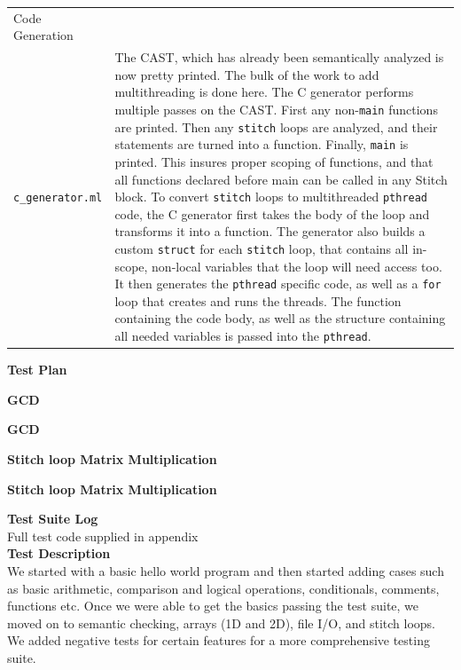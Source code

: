 \documentclass[11pt, oneside]{article}   	%
\begin{document}
\begin{tabular}{ l p{12cm} }
Code Generation\\\verb|c_generator.ml| & The CAST, which has already been semantically analyzed is now pretty printed.  The bulk of the work to add multithreading is done here.  The C generator performs multiple passes on the CAST.  First any non-\verb|main| functions are printed.  Then any \verb|stitch| loops are analyzed, and their statements are turned into a function.  Finally, \verb|main| is printed.  This insures proper scoping of functions, and that all functions declared before main can be called in any Stitch block.  To convert \verb|stitch| loops to multithreaded \verb|pthread| code, the C generator first takes the body of the loop and transforms it into a function.  The generator also builds a custom \verb|struct| for each \verb|stitch| loop, that contains all in-scope, non-local variables that the loop will need access too.  It then generates the \verb|pthread| specific code, as well as a \verb|for| loop that creates and runs the threads.  The function containing the code body, as well as the structure containing all needed variables is passed into the \verb|pthread|.
\end{tabular}
\newpage


\LARGE\textbf{Test Plan}\\[2em]
\normalsize

\Large\textbf{GCD}\\[1em]
\normalsize

\newpage
\Large\textbf{GCD}\\[1em]
\normalsize

\newpage
\Large\textbf{Stitch loop Matrix Multiplication}\\[1em]
\normalsize

\newpage
\Large\textbf{Stitch loop Matrix Multiplication}\\[1em]
\normalsize

\newpage
\Large\textbf{Test Suite Log}\\[1em]
\normalsize
Full test code supplied in appendix\\

\newpage
\Large\textbf{Test Description}\\[1em]
\normalsize
We started with a basic hello world program and then started adding cases such as basic arithmetic, comparison and logical operations, conditionals, comments, functions etc. Once we were able to get the basics passing the test suite, we moved on to semantic checking, arrays (1D and 2D), file I/O, and stitch loops. We added negative tests for certain features for a more comprehensive testing suite.\\
\end{document}
